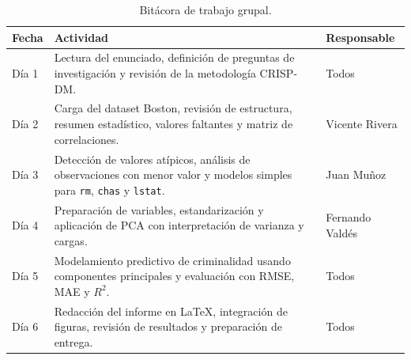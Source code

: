 \documentclass[10pt,a4paper]{article}
\begin{document}
\begin{table}[H]
  \centering
  \footnotesize
  \caption{Bitácora de trabajo grupal.}
  \label{tab:bitacora}
  \begin{tabularx}{\textwidth}{l X l}
    \toprule
    \textbf{Fecha} & \textbf{Actividad} & \textbf{Responsable} \\
    \midrule
    Día 1 & Lectura del enunciado, definición de preguntas de investigación y revisión de la metodología CRISP-DM. & Todos \\
    Día 2 & Carga del dataset Boston, revisión de estructura, resumen estadístico, valores faltantes y matriz de correlaciones. & Vicente Rivera \\
    Día 3 & Detección de valores atípicos, análisis de observaciones con menor valor y modelos simples para \texttt{rm}, \texttt{chas} y \texttt{lstat}. & Juan Mu\~noz \\
    Día 4 & Preparación de variables, estandarización y aplicación de PCA con interpretación de varianza y cargas. & Fernando Valdés \\
    Día 5 & Modelamiento predictivo de criminalidad usando componentes principales y evaluación con RMSE, MAE y $R^{2}$. & Todos \\
    Día 6 & Redacción del informe en LaTeX, integración de figuras, revisión de resultados y preparación de entrega. & Todos \\
    \bottomrule
  \end{tabularx}
\end{table}
\end{document}
